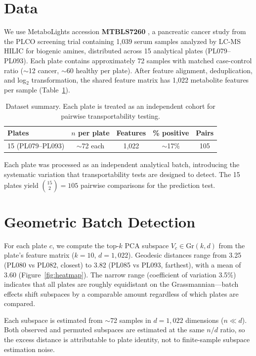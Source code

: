\documentclass{article}
\begin{document}
\section{Data}

We use MetaboLights accession \textbf{MTBLS7260} \citep{leonletelier2024contributions}, a pancreatic cancer study from the PLCO screening trial containing 1{,}039 serum samples analyzed by LC-MS HILIC for biogenic amines, distributed across 15 analytical plates (PL079--PL093). Each plate contains approximately 72 samples with matched case-control ratio ($\sim$12 cancer, $\sim$60 healthy per plate). After feature alignment, deduplication, and log$_2$ transformation, the shared feature matrix has 1{,}022 metabolite features per sample (Table~\ref{tab:cohorts}).

\begin{table}[t]
\centering
\caption{Dataset summary. Each plate is treated as an independent cohort for pairwise transportability testing.}
\label{tab:cohorts}
\begin{tabular}{lcccc}
\toprule
Plates & $n$ per plate & Features & \% positive & Pairs \\
\midrule
15 (PL079--PL093) & $\sim$72 each & 1{,}022 & $\sim$17\% & 105 \\
\bottomrule
\end{tabular}
\end{table}

Each plate was processed as an independent analytical batch, introducing the systematic variation that transportability tests are designed to detect. The 15 plates yield $\binom{15}{2} = 105$ pairwise comparisons for the prediction test.


\section{Geometric Batch Detection}
\label{sec:batch}

For each plate $c$, we compute the top-$k$ PCA subspace $V_c \in \mathrm{Gr}(k, d)$ from the plate's feature matrix ($k = 10$, $d = 1{,}022$). Geodesic distances range from 3.25 (PL080 vs PL082, closest) to 3.82 (PL085 vs PL093, farthest), with a mean of 3.60 (Figure~\ref{fig:heatmap}). The narrow range (coefficient of variation 3.5\%) indicates that all plates are roughly equidistant on the Grassmannian---batch effects shift subspaces by a comparable amount regardless of which plates are compared.

Each subspace is estimated from $\sim$72 samples in $d = 1{,}022$ dimensions ($n \ll d$). Both observed and permuted subspaces are estimated at the same $n/d$ ratio, so the excess distance is attributable to plate identity, not to finite-sample subspace estimation noise.
\end{document}
